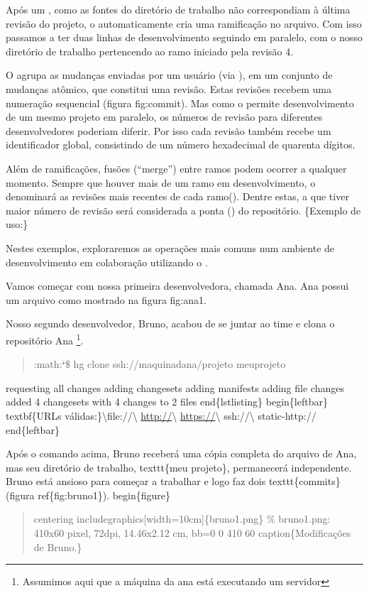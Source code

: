 \documentclass[a4paper,10pt,portuguese]{sphinxmanual}
\begin{document}
Após um , como as fontes do diretório de trabalho não
correspondiam à última revisão do projeto, o 
automaticamente cria uma ramificação no arquivo. Com isso passamos
a ter duas linhas de desenvolvimento seguindo em paralelo, com o
nosso diretório de trabalho pertencendo ao ramo iniciado pela
revisão 4.

O  agrupa as mudanças enviadas por um usuário (via
), em um conjunto de mudanças atômico, que constitui uma
revisão. Estas revisões recebem uma numeração sequencial (figura
fig:commit). Mas como o  permite desenvolvimento de um
mesmo projeto em paralelo, os números de revisão para diferentes
desenvolvedores poderiam diferir. Por isso cada revisão também
recebe um identificador global, consistindo de um número
hexadecimal de quarenta dígitos.

Além de ramificações, fusões (``merge'') entre ramos podem ocorrer a
qualquer momento. Sempre que houver mais de um ramo em
desenvolvimento, o  denominará as revisões mais
recentes de cada ramo(). Dentre estas, a que
tiver maior número de revisão será considerada a ponta () do
repositório. \{Exemplo de uso:\}

Nestes exemplos, exploraremos as operações mais comuns num ambiente
de desenvolvimento em colaboração utilizando o .

Vamos começar com nossa primeira desenvolvedora, chamada Ana. Ana
possui um arquivo como mostrado na figura fig:ana1.

Nosso segundo desenvolvedor, Bruno, acabou de se juntar ao time e
clona o repositório Ana \footnote{
Assumimos aqui que a máquina da ana está executando um servidor
}.
\begin{quote}

:math:{\color{red}\bfseries{}{}`}\$ hg clone ssh://maquinadana/projeto meuprojeto
\end{quote}

requesting all changes
adding changesets
adding manifests
adding file changes
added 4 changesets with 4 changes to 2 files
end\{lstlisting\}
begin\{leftbar\}
textbf\{URLs válidas:\}\textbackslash{}file://\textbackslash{} \href{http://}{http://}\textbackslash{} \href{https://}{https://}\textbackslash{} ssh://\textbackslash{} static-http://
end\{leftbar\}

Após o comando acima, Bruno receberá uma cópia completa do arquivo de Ana, mas seu diretório de trabalho, texttt\{meu projeto\}, permanecerá independente. Bruno está ansioso para começar a trabalhar e logo faz dois texttt\{commits\} (figura ref\{fig:bruno1\}).
begin\{figure\}
\begin{quote}

centering
includegraphics{[}width=10cm{]}\{bruno1.png\}
\% bruno1.png: 410x60 pixel, 72dpi, 14.46x2.12 cm, bb=0 0 410 60
caption\{Modificações de Bruno.\}
\end{quote}
\end{document}
